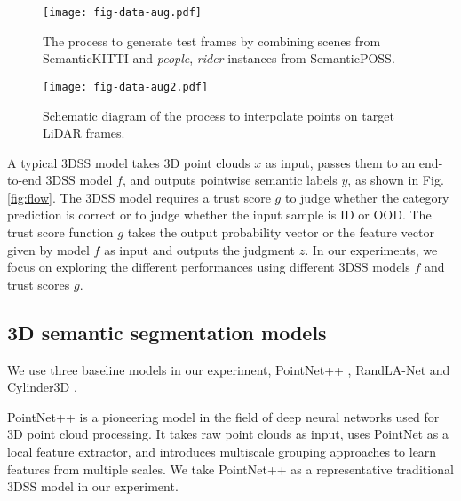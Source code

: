 \documentclass[journal]{IEEEtran}
\begin{document}

\begin{figure*}[t]
	\centering
	\texttt{[image: fig-data-aug.pdf]}
	\vspace{-2mm}
	\caption{The process to generate test frames by combining scenes from SemanticKITTI and \textit{people}, \textit{rider} instances from SemanticPOSS.}
	\label{fig:data aug}
	\vspace{-4mm}
\end{figure*}

\begin{figure}[t]
	\centering
	\texttt{[image: fig-data-aug2.pdf]}
	\vspace{-6mm}
	\caption{Schematic diagram of the process to interpolate points on target LiDAR frames.}
	\label{fig:data aug2}
	\vspace{-4mm}
\end{figure}

A typical 3DSS model takes 3D point clouds $x$ as input, passes them to an end-to-end 3DSS model $f$, and outputs pointwise semantic labels $y$, as shown in Fig. \ref{fig:flow}. The 3DSS model requires a trust score $g$ to judge whether the category prediction is correct or to judge whether the input sample is ID or OOD. The trust score function $g$ takes the output probability vector or the feature vector given by model $f$ as input and outputs the judgment $z$. In our experiments, we focus on exploring the different performances using different 3DSS models $f$ and trust scores $g$.

\subsection{3D semantic segmentation models}
We use three baseline models in our experiment, PointNet++ \cite{qi2017pointnet++}, RandLA-Net \cite{hu2019randla} and Cylinder3D \cite{zhou2020cylinder3d}.%

PointNet++ is a pioneering model in the field of deep neural networks used for 3D point cloud processing. It takes raw point clouds as input, uses PointNet \cite{qi2017pointnet} as a local feature extractor, and introduces multiscale grouping approaches to learn features from multiple scales. We take PointNet++ as a representative traditional 3DSS model in our experiment. 
\end{document}
